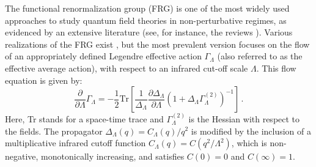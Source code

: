 \documentclass[11pt,a4paper]{article}
\numberwithin{figure}{section}
\numberwithin{equation}{section}
\begin{document}
The functional renormalization group (FRG) is one of the most widely used approaches to study quantum field theories in non-perturbative regimes, as evidenced by an extensive literature (see, for instance, the reviews \cite{Morris:1998,Bagnuls:2000,Berges:2000ew,Pelissetto:2000ek,Rosten:2010vm,Dupuis:2020fhh}).
Various realizations of the FRG exist \cite{Wilson:1973,Wegner:1972ih,Polchinski:1983gv,Latorre:2000qc,Arnone:2002cs,Nicoll1977,Wetterich:1992,Morris:1993,Weinberg:1976xy,Bonini:1992vh,Ellwanger1994a,Morgan1991}, but the most prevalent version \cite{Nicoll1977,Wetterich:1992,Morris:1993,Weinberg:1976xy,Bonini:1992vh,Ellwanger1994a,Morgan1991} focuses on the flow of an appropriately defined Legendre effective action $\Gamma_\Lambda$ (also referred to as the effective average action), with respect to an infrared cut-off scale $\Lambda$. This flow equation is given by:
\begin{equation}
\label{flow}
    \frac{\partial}{\partial\Lambda} \Gamma_\Lambda=-\frac{1}{2}\text{Tr}\left[   \frac{1}{\Delta_\Lambda} \frac{\partial \Delta_\Lambda}{\partial\Lambda}\left(1+\Delta_\Lambda \Gamma^{(2)}_\Lambda\right)^{-1}  \right] \,.
\end{equation}
Here, Tr stands for a space-time trace and $\Gamma^{(2)}_\Lambda$ is the Hessian with respect to the fields. The propagator $\Delta_\Lambda(q)=C_\Lambda(q)/q^2$ is modified by the inclusion of a multiplicative infrared cutoff function $C_\Lambda(q)=C(q^2/\Lambda^2)$, which is non-negative, monotonically increasing, and satisfies $C(0)=0$ and $C(\infty)=1$.
\end{document}
